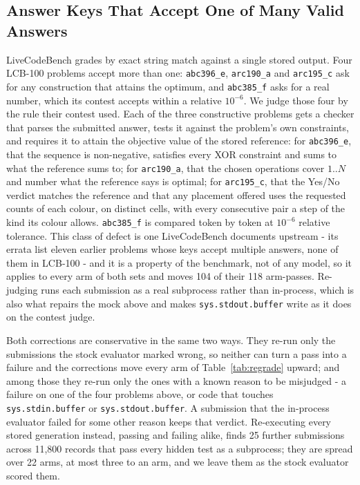 \documentclass[journal,onecolumn]{IEEEtran}
\begin{document}
\subsection{Answer Keys That Accept One of Many Valid Answers} LiveCodeBench grades by exact
string match against a single stored output. Four LCB-100 problems accept more than one:
\texttt{abc396\_e}, \texttt{arc190\_a} and \texttt{arc195\_c} ask for any construction that
attains the optimum, and \texttt{abc385\_f} asks for a real number, which its contest accepts
within a relative $10^{-6}$. We judge those four by the rule their contest used. Each of the three
constructive problems gets a checker that parses the submitted answer, tests it against the
problem's own constraints, and requires it to attain the objective value of the stored reference:
for \texttt{abc396\_e}, that the sequence is non-negative, satisfies every XOR constraint and sums
to what the reference sums to; for \texttt{arc190\_a}, that the chosen operations cover $1..N$ and
number what the reference says is optimal; for \texttt{arc195\_c}, that the Yes/No verdict matches
the reference and that any placement offered uses the requested counts of each colour, on distinct
cells, with every consecutive pair a step of the kind its colour allows. \texttt{abc385\_f} is
compared token by token at $10^{-6}$ relative tolerance. This class of defect is one LiveCodeBench documents upstream - its errata
list eleven earlier problems whose keys accept multiple answers, none of them in LCB-100 - and
it is a property of the benchmark, not of any model, so it applies to every arm of both sets and
moves 104 of their 118 arm-passes. Re-judging
runs each submission as a real subprocess rather than in-process, which is also what repairs the
mock above and makes \texttt{sys.stdout.buffer} write as it does on the contest judge.

Both corrections are conservative in the same two ways. They re-run only the submissions the stock
evaluator marked wrong, so neither can turn a pass into a failure and the corrections move every
arm of Table~\ref{tab:regrade} upward; and among those they re-run only
the ones with a known reason to be misjudged - a failure on one of the four problems above, or
code that touches \texttt{sys.stdin.buffer} or \texttt{sys.stdout.buffer}. A submission that the
in-process evaluator failed for some other reason keeps that verdict. Re-executing every stored
generation instead, passing and failing alike, finds 25 further submissions across 11{,}800
records that pass every hidden test as a subprocess; they are spread over 22 arms, at most three
to an arm, and we leave them as the stock evaluator scored them.
\end{document}

